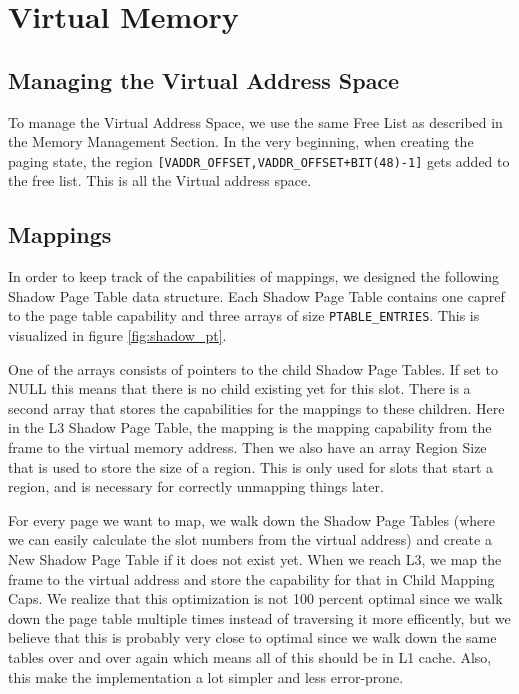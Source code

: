 \chapter{Virtual Memory}


\section{Managing the Virtual Address Space}

To manage the Virtual Address Space, we use the same Free List as described in the Memory Management Section. In the very beginning, when creating the paging state, the region \texttt{[VADDR_OFFSET,VADDR_OFFSET+BIT(48)-1]} gets added to the free list. This is all the Virtual address space.

\section{Mappings}

In order to keep track of the capabilities of mappings, we designed the following Shadow Page Table data structure.
Each Shadow Page Table contains one capref to the page table capability and three arrays of size \texttt{PTABLE_ENTRIES}. This is visualized in figure \ref{fig:shadow_pt}.

One of the arrays consists of pointers to the child Shadow Page Tables. If set to NULL this means that there is no child existing yet for this slot. There is a second array that stores the capabilities for the mappings to these children. Here in the L3 Shadow Page Table, the mapping is the mapping capability from the frame to the virtual memory address.
Then we also have an array Region Size that is used to store the size of a region. This is only used for slots that start a region, and is necessary for correctly unmapping things later.

For every page we want to map, we walk down the Shadow Page Tables (where we can easily calculate the slot numbers from the virtual address) and create a New Shadow Page Table if it does not exist yet. When we reach L3, we map the frame to the virtual address and store the capability for that in Child Mapping Caps. We realize that this optimization is not 100 percent optimal since we walk down the page table multiple times instead of traversing it more efficently, but we believe that this is probably very close to optimal since we walk down the same tables over and over again which means all of this should be in L1 cache. Also, this make the implementation a lot simpler and less error-prone.


